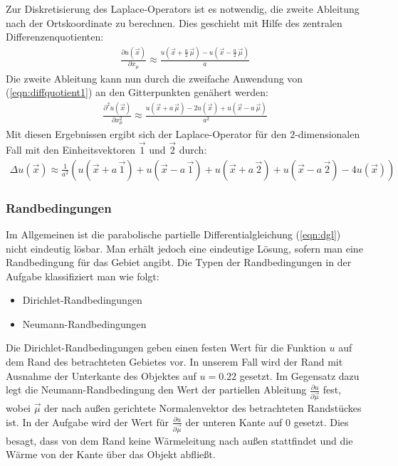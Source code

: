 \documentclass[10pt,a4paper]{article}
\begin{document}
Zur Diskretisierung des Laplace-Operators ist es notwendig, die zweite Ableitung nach der Ortskoordinate zu berechnen. Dies geschieht mit Hilfe des zentralen Differenzenquotienten:
\begin{align}
\frac{\partial u(\vec{x})}{\partial x_{\mu}}\approx\frac{u(\vec{x}+\frac{a}{2}\,\vec{\mu}) - u(\vec{x}-\frac{a}{2}\,\vec{\mu})}{a}
\label{eqn:diffquotient1}
\end{align}
Die zweite Ableitung kann nun durch die zweifache Anwendung von (\ref{eqn:diffquotient1}) an den Gitterpunkten genähert werden:
\begin{align}
\frac{\partial^2 u(\vec{x})}{\partial x_{\mu}^2}\approx\frac{u(\vec{x}+a\,\vec{\mu})-2 u(\vec{x})+u(\vec{x}-a\,\vec{\mu})}{a^2}
\label{eqn:diffquotient2}
\end{align}
Mit diesen Ergebnissen ergibt sich der Laplace-Operator für den $2$-dimensionalen Fall mit den Einheitsvektoren $\vec{1}$ und $\vec{2}$ durch:
\begin{align}
\Delta u(\vec{x})\approx\frac{1}{a^2}\left(u(\vec{x}+a\,\vec{1}) + u(\vec{x}-a\,\vec{1}) + u(\vec{x}+a\,\vec{2})+u(\vec{x}-a\,\vec{2}) -4 u(\vec{x})\right)
\label{eqn:diskret_laplace}
\end{align}

\subsubsection{Randbedingungen}
\label{randbedingungen}
Im Allgemeinen ist die parabolische partielle Differentialgleichung (\ref{eqn:dgl}) nicht eindeutig lösbar. Man erhält jedoch eine eindeutige Lösung, sofern man eine Randbedingung für das Gebiet angibt. Die Typen der Randbedingungen in der Aufgabe klassifiziert man wie folgt:
\begin{itemize}
\item Dirichlet-Randbedingungen
\item Neumann-Randbedingungen
\end{itemize}
Die Dirichlet-Randbedingungen geben einen festen Wert für die Funktion $u$ auf dem Rand des betrachteten Gebietes vor. In unserem Fall wird der Rand mit Ausnahme der Unterkante des Objektes auf $u = \num{0.22}$ gesetzt. 
Im Gegensatz dazu legt die Neumann-Randbedingung den Wert der partiellen Ableitung $\frac{\partial u}{\partial \vec{\mu}}$ fest, wobei $\vec{\mu}$ der nach außen gerichtete Normalenvektor des betrachteten Randstückes ist. In der Aufgabe wird der Wert für $\frac{\partial u}{\partial \vec{\mu}}$ der unteren Kante auf $\num{0}$ gesetzt. Dies besagt, dass von dem Rand keine Wärmeleitung nach außen stattfindet und die Wärme von der Kante über das Objekt abfließt.
\end{document}
